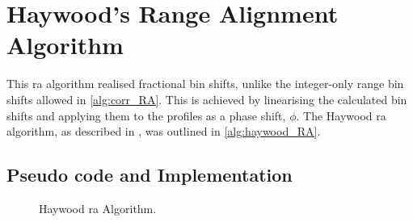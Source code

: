 \documentclass[class=report,11pt,crop=false]{standalone}
\begin{document}
\section{Haywood's Range Alignment Algorithm}\label{subsec:HayRA}
This \gls{ra} algorithm realised fractional bin shifts, unlike the integer-only range bin shifts allowed in \autoref{alg:corr_RA}. This is achieved by linearising the calculated bin shifts and applying them to the profiles as a phase shift, $\phi$. The Haywood \gls{ra} algorithm, as described in \cite{haywood_RA_AF,zyweck}, was outlined in \autoref{alg:haywood_RA}.
    \subsection{Pseudo code and Implementation}
    \begin{figure}[H]
      \vspace{0.5cm}
      \centering
      \captionsetup{type=figure}
      \begin{minipage}{.7\linewidth}
        \begin{algorithm}[H]
        \caption{Haywood \gls{ra} Algorithm.\label{alg:haywood_RA}}
    
        \LinesNumbered %
        \DontPrintSemicolon
        \SetAlgoLined
    
    
        \BlankLine
        \vspace{0.5cm}
        \end{algorithm}
      \end{minipage}
    \end{figure}
\end{document}
